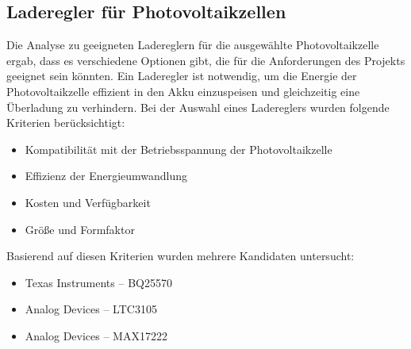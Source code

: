 \documentclass{article}
\begin{document}
\subsection{Laderegler für Photovoltaikzellen}
Die Analyse zu geeigneten Ladereglern für die ausgewählte Photovoltaikzelle ergab, dass es verschiedene Optionen gibt, die für die Anforderungen des Projekts geeignet sein 
könnten. Ein Laderegler ist notwendig, um die Energie der Photovoltaikzelle effizient in den Akku einzuspeisen und gleichzeitig eine Überladung zu verhindern.
Bei der Auswahl eines Ladereglers wurden folgende Kriterien berücksichtigt:
\begin{itemize}
    \item Kompatibilität mit der Betriebsspannung der Photovoltaikzelle
    \item Effizienz der Energieumwandlung
    \item Kosten und Verfügbarkeit
    \item Größe und Formfaktor
\end{itemize}
Basierend auf diesen Kriterien wurden mehrere Kandidaten untersucht:
\begin{itemize}
    \item Texas Instruments – BQ25570 \cite{BQ25570}
    \item Analog Devices – LTC3105 \cite{LTC3105}
    \item Analog Devices – MAX17222 \cite{MAX17222}
\end{itemize}
\end{document}
